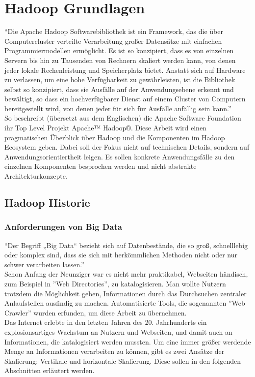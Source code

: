 \chapter{Hadoop Grundlagen}

``Die Apache Hadoop Softwarebibliothek ist ein Framework, das die über Computercluster verteilte Verarbeitung großer Datensätze mit einfachen Programmiermodellen ermöglicht. Es ist so konzipiert, dass es von einzelnen Servern bis hin zu Tausenden von Rechnern skaliert werden kann, von denen jeder lokale Rechenleistung und Speicherplatz bietet. Anstatt sich auf Hardware zu verlassen, um eine hohe Verfügbarkeit zu gewährleisten, ist die Bibliothek selbst so konzipiert, dass sie Ausfälle auf der Anwendungsebene erkennt und bewältigt, so dass ein hochverfügbarer Dienst auf einem Cluster von Computern bereitgestellt wird, von denen jeder für sich für Ausfälle anfällig sein kann.''\cite{noauthor_apache_nodate}\\
So beschreibt (übersetzt aus dem Englischen) die Apache Software Foundation ihr Top Level Projekt Apache™ Hadoop®.  Diese Arbeit wird einen pragmatischen Überblick über Hadoop und die Komponenten im Hadoop Ecosystem geben. Dabei soll der Fokus nicht auf technischen Details, sondern auf Anwendungsorientiertheit leigen. Es sollen konkrete Anwendungsfälle zu den einzelnen Komponenten besprochen werden und nicht abstrakte Architekturkonzepte.

\section{Hadoop Historie}
\subsection{Anforderungen von Big Data}
``Der Begriff „Big Data“ bezieht sich auf Datenbestände, die so groß, schnelllebig oder komplex sind, dass sie sich mit herkömmlichen Methoden nicht oder nur schwer verarbeiten lassen.''\cite{noauthor_big_nodate} \\ 
Schon Anfang der Neunziger war es nicht mehr praktikabel, Webseiten händisch, zum Beispiel in ''Web Directories'', zu katalogisieren. Man wollte Nutzern trotzdem die Möglichkeit geben, Informationen durch das Durchsuchen zentraler Anlaufstellen ausfindig zu machen. Automatisierte Tools, die sogenannten ''Web Crawler'' wurden erfunden, um diese Arbeit zu übernehmen.\cite{griffiths_search_2007} \\ 
Das Internet erlebte in den letzten Jahren des 20. Jahrhunderts ein explosionsartiges Wachstum an Nutzern und Webseiten, und damit auch an Informationen, die katalogisiert werden mussten.\cite{zakon_hobbes_2018} 
Um eine immer größer werdende Menge an Informationen verarbeiten zu können, gibt es zwei Ansätze der Skalierung: Vertikale und horizontale Skalierung. Diese sollen in den folgenden Abschnitten erläutert werden.

